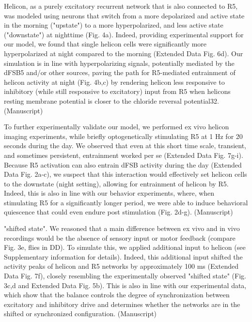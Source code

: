Helicon, as a purely excitatory recurrent network
that is also connected to R5, was modeled using neurons that switch from a more depolarized
and active state in the morning ("upstate") to a more hyperpolarized, and less active state
("downstate") at nighttime (Fig. 4a). Indeed, providing experimental support for our model,
we found that single helicon cells were significantly more hyperpolarized at night compared
to the morning (Extended Data Fig. 6d). Our simulation is in line with hyperpolarizing signals,
potentially mediated by the dFSB5 and/or other sources, paving the path for R5-mediated
entrainment of helicon activity at night (Fig. 4b,c) by rendering helicon less responsive to
inhibitory (while still responsive to excitatory) input from R5 when helicons resting membrane
potential is closer to the chloride reversal potential32. 
\parencite{raccugliaCoherentMultilevelNetwork2022} (Manuscript)

To further experimentally validate our model, we performed ex vivo helicon imaging
experiments, while briefly optogenetically stimulating R5 at 1 Hz for 20 seconds during the
day. We observed that even at this short time scale, transient, and sometimes persistent,
entrainment worked per se (Extended Data Fig. 7g-i). Because R5 activation can also entrain
dFSB activity during the day (Extended Data Fig. 2a-c), we suspect that this interaction would
effectively set helicon cells to the downstate (night setting), allowing for entrainment of
helicon by R5. Indeed, this is also in line with our behavior experiments, where, when
stimulating R5 for a significantly longer period, we were able to induce behavioral quiescence
that could even endure post stimulation (Fig. 2d-g).
\parencite{raccugliaCoherentMultilevelNetwork2022} (Manuscript)

"shifted state". We
reasoned that a main difference between ex vivo and in vivo recordings would be the absence
of sensory input or motor feedback (compare Fig. 3e, flies in DD). To simulate this, we applied
additional input to helicon (see Supplementary information for details). Indeed, this
additional input shifted the activity peaks of helicon and R5 networks by approximately 100
ms (Extended Data Fig. 7f), closely resembling the experimentally observed "shifted state" (Fig.
3c,d and Extended Data Fig. 5b). This is also in line with our experimental data, which show
that the balance controls the degree of synchronization between excitatory and inhibitory
drive and determines whether the networks are in the shifted or synchronized configuration.
\parencite{raccugliaCoherentMultilevelNetwork2022} (Manuscript)


